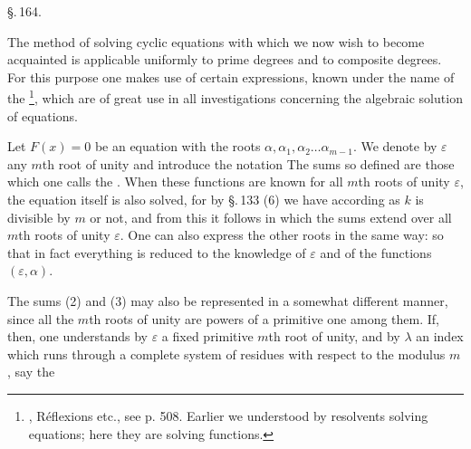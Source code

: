 
\begin{center}
\S.\,164.\\
\end{center}

The method of solving cyclic equations with which we now wish to become acquainted is applicable uniformly to prime degrees and to composite degrees. For this purpose one makes use of certain expressions, known under the name of the \footnote{, Réflexions etc., see p. 508. Earlier we understood by resolvents solving equations; here they are solving functions.}, which are of great use in all investigations concerning the algebraic solution of equations.

Let $F(x) = 0$ be an equation with the roots $\alpha, \alpha_1, \alpha_2 \ldots \alpha_{m-1}$. We denote by $\varepsilon$ any $m$th root of unity and introduce the notation
The sums so defined are those which one calls the . When these functions are known for all $m$th roots of unity $\varepsilon$, the equation itself is also solved, for by \S.\,133 (6) we have
according as $k$ is divisible by $m$ or not, and from this it follows
in which the sums extend over all $m$th roots of unity $\varepsilon$. One can also express the other roots in the same way:
so that in fact everything is reduced to the knowledge of $\varepsilon$ and of the functions $(\varepsilon, \alpha)$.

The sums (2) and (3) may also be represented in a somewhat different manner, since all the $m$th roots of unity are powers of a primitive one among them. If, then, one understands by $\varepsilon$ a fixed primitive $m$th root of unity, and by $\lambda$ an index which runs through a complete system of residues with respect to the modulus $m$, say the
